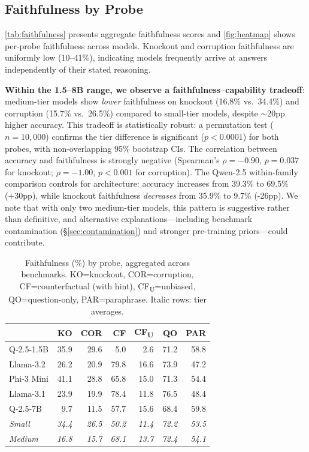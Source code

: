 \documentclass[11pt]{article}
\begin{document}
\subsection{Faithfulness by Probe}

\autoref{tab:faithfulness} presents aggregate faithfulness scores and \autoref{fig:heatmap} shows per-probe faithfulness across models. Knockout and corruption faithfulness are uniformly low (10--41\%), indicating models frequently arrive at answers independently of their stated reasoning.

\textbf{Within the 1.5--8B range, we observe a faithfulness--capability tradeoff}: medium-tier models show \emph{lower} faithfulness on knockout (16.8\% vs.\ 34.4\%) and corruption (15.7\% vs.\ 26.5\%) compared to small-tier models, despite ${\sim}$20pp higher accuracy. This tradeoff is statistically robust: a permutation test ($n{=}10{,}000$) confirms the tier difference is significant ($p < 0.0001$) for both probes, with non-overlapping 95\% bootstrap CIs. The correlation between accuracy and faithfulness is strongly negative (Spearman's $\rho{=}{-}0.90$, $p{=}0.037$ for knockout; $\rho{=}{-}1.00$, $p{<}0.001$ for corruption). The Qwen-2.5 within-family comparison controls for architecture: accuracy increases from 39.3\% to 69.5\% (+30pp), while knockout faithfulness \emph{decreases} from 35.9\% to 9.7\% (-26pp). We note that with only two medium-tier models, this pattern is suggestive rather than definitive, and alternative explanations---including benchmark contamination (\S\ref{sec:contamination}) and stronger pre-training priors---could contribute.

\begin{table}[t]
\centering\small
\setlength{\tabcolsep}{3.5pt}
\begin{tabular}{lrrrrrr}
\toprule
 & \textbf{KO} & \textbf{COR} & \textbf{CF} & \textbf{CF\textsubscript{U}} & \textbf{QO} & \textbf{PAR} \\
\midrule
Q-2.5-1.5B & 35.9 & 29.6 & 5.0 & 2.6 & 71.2 & 58.8 \\
Llama-3.2 & 26.2 & 20.9 & 79.8 & 16.6 & 73.9 & 47.2 \\
Phi-3 Mini & 41.1 & 28.8 & 65.8 & 15.0 & 71.3 & 54.4 \\
\midrule
Llama-3.1 & 23.9 & 19.9 & 78.4 & 11.8 & 76.5 & 48.4 \\
Q-2.5-7B & 9.7 & 11.5 & 57.7 & 15.6 & 68.4 & 59.8 \\
\midrule
\textit{Small} & \textit{34.4} & \textit{26.5} & \textit{50.2} & \textit{11.4} & \textit{72.2} & \textit{53.5} \\
\textit{Medium} & \textit{16.8} & \textit{15.7} & \textit{68.1} & \textit{13.7} & \textit{72.4} & \textit{54.1} \\
\bottomrule
\end{tabular}
\caption{Faithfulness (\%) by probe, aggregated across benchmarks. KO=knockout, COR=corruption, CF=counterfactual (with hint), CF\textsubscript{U}=unbiased, QO=question-only, PAR=paraphrase. Italic rows: tier averages.}
\label{tab:faithfulness}
\end{table}
\end{document}
